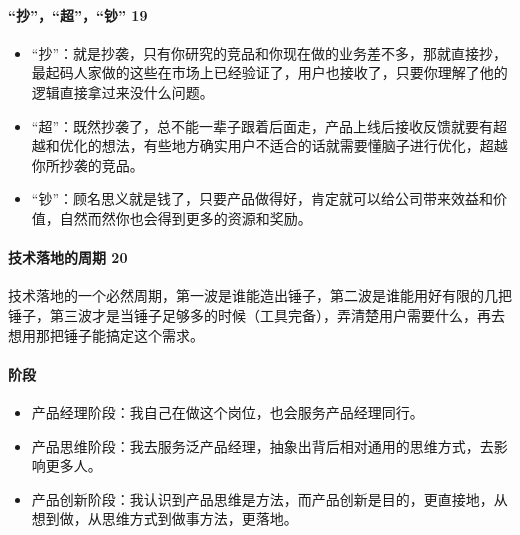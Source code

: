 \documentclass[letterpaper,11pt,english]{sphinxmanual}
\begin{document}
\paragraph{“抄”，“超”，“钞” 19\sphinxfootnotemark[167]}
\label{\detokenize{chapter_introduction/PM:id57}}%
\begin{footnotetext}[167]\sphinxAtStartFootnote
{}
%
\end{footnotetext}\ignorespaces \begin{itemize}
\item {} 
“抄”：就是抄袭，只有你研究的竞品和你现在做的业务差不多，那就直接抄，最起码人家做的这些在市场上已经验证了，用户也接收了，只要你理解了他的逻辑直接拿过来没什么问题。

\item {} 
“超”：既然抄袭了，总不能一辈子跟着后面走，产品上线后接收反馈就要有超越和优化的想法，有些地方确实用户不适合的话就需要懂脑子进行优化，超越你所抄袭的竞品。

\item {} 
“钞”：顾名思义就是钱了，只要产品做得好，肯定就可以给公司带来效益和价值，自然而然你也会得到更多的资源和奖励。

\end{itemize}


\paragraph{技术落地的周期 20\sphinxfootnotemark[168]}
\label{\detokenize{chapter_introduction/PM:id58}}%
\begin{footnotetext}[168]\sphinxAtStartFootnote
{}
%
\end{footnotetext}\ignorespaces 
技术落地的一个必然周期，第一波是谁能造出锤子，第二波是谁能用好有限的几把锤子，第三波才是当锤子足够多的时候（工具完备），弄清楚用户需要什么，再去想用那把锤子能搞定这个需求。


\paragraph{阶段}
\label{\detokenize{chapter_introduction/PM:id59}}\begin{itemize}
\item {} 
产品经理阶段：我自己在做这个岗位，也会服务产品经理同行。

\item {} 
产品思维阶段：我去服务泛产品经理，抽象出背后相对通用的思维方式，去影响更多人。

\item {} 
产品创新阶段：我认识到产品思维是方法，而产品创新是目的，更直接地，从想到做，从思维方式到做事方法，更落地。

\end{itemize}
\end{document}
